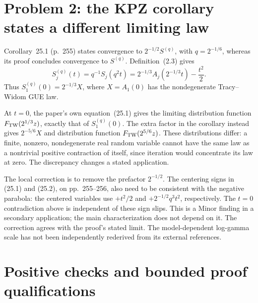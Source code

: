 \documentclass[10pt]{article}
\begin{document}
\section*{Problem 2: the KPZ corollary states a different limiting law}
Corollary 25.1 (p. 255) states convergence to \(2^{-1/2}S^{(q)}\), with \(q=2^{-1/6}\), whereas its proof concludes convergence to \(S^{(q)}\). Definition (2.3) gives \[S_j^{(q)}(t)=q^{-1}S_j(q^2t)
       =2^{-1/3}A_j(2^{-1/3}t)-\frac{t^2}{2}.\] Thus \(S_1^{(q)}(0)=2^{-1/3}X\), where \(X=A_1(0)\) has the nondegenerate Tracy–Widom GUE law.\par
At \(t=0\), the paper’s own equation (25.1) gives the limiting distribution function \(F_{\rm TW}(2^{1/3}z)\), exactly that of \(S_1^{(q)}(0)\). The extra factor in the corollary instead gives \(2^{-5/6}X\) and distribution function \(F_{\rm TW}(2^{5/6}z)\). These distributions differ: a finite, nonzero, nondegenerate real random variable cannot have the same law as a nontrivial positive contraction of itself, since iteration would concentrate its law at zero. The discrepancy changes a stated application.\par
The local correction is to remove the prefactor \(2^{-1/2}\). The centering signs in (25.1) and (25.2), on pp. 255–256, also need to be consistent with the negative parabola: the centered variables use \(+t^2/2\) and \(+2^{-1/2}q^3t^2\), respectively. The \(t=0\) contradiction above is independent of these sign slips. This is a Minor finding in a secondary application; the main characterization does not depend on it. The correction agrees with the proof’s stated limit. The model-dependent log-gamma scale has not been independently rederived from its external references.\par
\section*{Positive checks and bounded proof qualifications}
\end{document}
